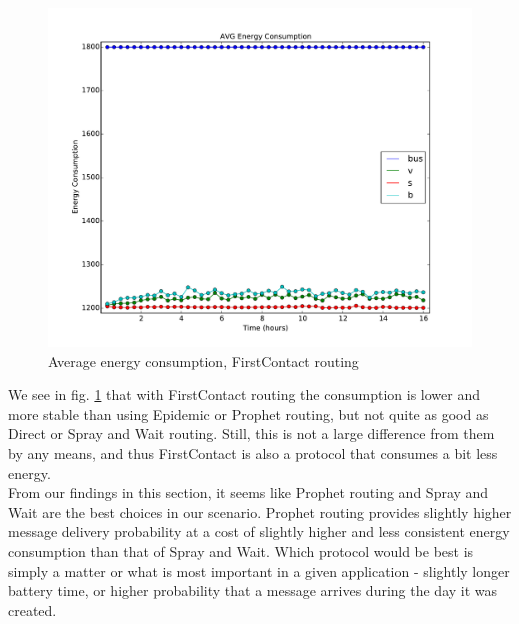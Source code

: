 \documentclass[conference]{IEEEtran}
\begin{document}
\begin{figure}
  \includegraphics[scale=0.25, center]{../one_1.5.1-RC2/plots/FirstContact_AVG_ENERGY_CONSUMPTION.pdf}
  \caption{Average energy consumption, FirstContact routing}
  \label{fig:avg_consumpt:firstcontact}
\end{figure}

We see in fig. \ref{fig:avg_consumpt:firstcontact} that with FirstContact routing the consumption is lower and more stable than using Epidemic or Prophet routing, but not quite as good as Direct or Spray and Wait routing. Still, this is not a large difference from them by any means, and thus FirstContact is also a protocol that consumes a bit less energy.\\
%

From our findings in this section, it seems like Prophet routing and Spray and Wait are the best choices in our scenario. Prophet routing provides slightly higher message delivery probability at a cost of slightly higher and less consistent energy consumption than that of Spray and Wait. Which protocol would be best is simply a matter or what is most important in a given application - slightly longer battery time, or higher probability that a message arrives during the day it was created.
\end{document}
